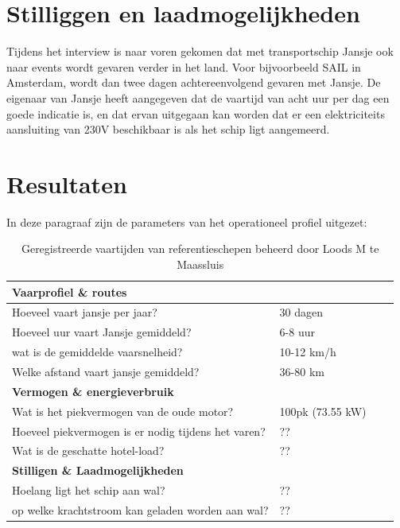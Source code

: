 \section{Stilliggen en laadmogelijkheden}
Tijdens het interview is naar voren gekomen dat met transportschip Jansje ook naar events wordt gevaren verder in het land. Voor bijvoorbeeld SAIL in Amsterdam, wordt dan twee dagen achtereenvolgend gevaren met Jansje. De eigenaar van Jansje heeft aangegeven dat de vaartijd van acht uur per dag een goede indicatie is, en dat ervan uitgegaan kan worden dat er een elektriciteits aansluiting van 230V beschikbaar is als het schip ligt aangemeerd.\\



\section{Resultaten}

In deze paragraaf zijn de parameters van het operationeel profiel uitgezet:

\begin{table}[H]
    \centering
    \caption{Geregistreerde vaartijden van referentieschepen beheerd door Loods M te Maassluis}
    \label{tab:vaartijden}
    \begin{tabular}{llll}
        \toprule
        \midrule
        \textbf{Vaarprofiel \& routes} & \\
        \midrule
        \bottomrule
        Hoeveel vaart jansje per jaar? & 30 dagen \\
        Hoeveel uur vaart Jansje gemiddeld? & 6-8 uur \\
        wat is de gemiddelde vaarsnelheid? & 10-12 km/h \\
        Welke afstand vaart jansje gemiddeld? & 36-80 km\\
        
        \toprule
        \midrule
        \textbf{Vermogen \& energieverbruik} & \\
        \midrule
        \bottomrule
        Wat is het piekvermogen van de oude motor? & 100pk (73.55 kW)\\
        Hoeveel piekvermogen is er nodig tijdens het varen? & ??\\
        Wat is de geschatte hotel-load? & ??\\
        
        \toprule
        \midrule
        \textbf{Stilligen \& Laadmogelijkheden} & \\
        \midrule
        \bottomrule
        Hoelang ligt het schip aan wal? & ??\\
        op welke krachtstroom kan geladen worden aan wal? & ??\\
        \toprule
        \midrule
        

        
    \end{tabular}
\end{table}




